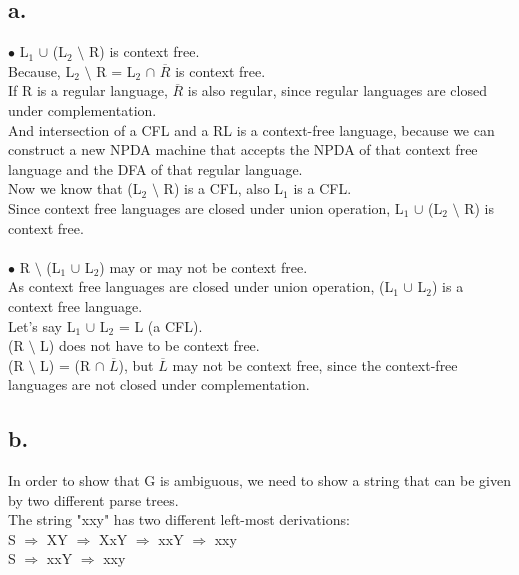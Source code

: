 \documentclass[12pt]{article}
\begin{document}
\subsection*{a.}
$\bullet$ L$_1$ $\cup$ (L$_2$ $\setminus$ R) is context free. \\
Because, L$_2$ $\setminus$ R =  L$_2$ $\cap$ $\overline{R}$ is context free. \\
If R is a regular language, $\overline{R}$ is also regular, since regular languages are closed under complementation. \\
And intersection of a CFL and a RL is a context-free language, because we can construct a new NPDA machine that accepts the NPDA of that context free language and the DFA of that regular language. \\
Now we know that (L$_2$ $\setminus$ R) is a CFL, also L$_1$ is a CFL. \\
Since context free languages are closed under union operation, L$_1$ $\cup$ (L$_2$ $\setminus$ R) is context free. \\
\\
$\bullet$ R $\setminus$ (L$_1$ $\cup$ L$_2$) may or may not be context free. \\
As context free languages are closed under union operation, (L$_1$ $\cup$ L$_2$) is a context free language. \\
Let's say L$_1$ $\cup$ L$_2$ = L (a CFL). \\
(R $\setminus$ L) does not have to be context free. \\
(R $\setminus$ L) = (R $\cap$ $\overline{L}$), but $\overline{L}$ may not be context free, since the context-free
languages are not closed under complementation. \\

\subsection*{b.}
In order to show that G is ambiguous, we need to show a string that can be given by two different parse trees. \\
The string "xxy" has two different left-most derivations: \\
S $\Rightarrow$ XY $\Rightarrow$ XxY $\Rightarrow$ xxY $\Rightarrow$ xxy \\
S $\Rightarrow$ xxY $\Rightarrow$ xxy \\
 \\
\end{document}

